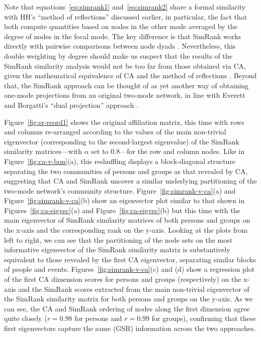 \documentclass[a4paper,fleqn]{cas-sc}
\begin{document}
Note that equations~\ref{eq:simrank1} and~\ref{eq:simrank2} share a formal similarity with HH's ``method of reflections'' discussed earlier, in particular, the fact that both compute quantities based on nodes in the other mode averaged by the degree of nodes in the focal mode. The key difference is that SimRank works directly with pairwise comparisons between node dyads \citep{jeh2002simrank}. Nevertheless, this double weighting by degree should make us suspect that the results of the SimRank similarity analysis would not be too far from those obtained via CA, given the mathematical equivalence of CA and the method of reflections \citep{mealy2019interpreting, van2021correspondence}. Beyond that, the SimRank approach can be thought of as yet another way of obtaining one-mode projections from an original two-mode network, in line with Everett and Borgatti's ``dual projection'' approach \citep{everett2013dual}.

Figure~\ref{fig:sr-reord1} shows the original affiliation matrix, this time with rows and columns re-arranged according to the values of the main non-trivial eigenvector (corresponding to the second-largest eigenvalue) of the SimRank similarity matrices---with $\alpha$ set to $0.8$---for the row and column nodes. Like in Figure~\ref{fig:ca-v-bon}(a), this reshuffling displays a block-diagonal structure separating the two communities of persons and groups as that revealed by CA, suggesting that CA and SimRank uncover a similar underlying partitioning of the two-mode network's community structure. Figure~\ref{fig:simrank-v-ca}(a) and Figure~\ref{fig:simrank-v-ca}(b) show an eigenvector plot similar to that shown in Figures~\ref{fig:ca-eigvec}(a) and Figure~\ref{fig:ca-eigvec}(b) but this time with the main eigenvector of SimRank similarity matrices of both persons and groups on the x-axis and the corresponding rank on the y-axis. Looking at the plots from left to right, we can see that the partitioning of the node sets on the most informative eigenvector of the SimRank similarity matrix is substantively equivalent to those revealed by the first CA eigenvector, separating similar blocks of people and events. Figures~\ref{fig:simrank-v-ca}(c) and (d) show a regression plot of the first CA dimension scores for persons and groups (respectively) on the x-axis and the SimRank scores extracted from the main non-trivial eigenvector of the SimRank similarity matrix for both persons and groups on the y-axis. As we can see, the CA and SimRank ordering of nodes along the first dimension agree quite closely ($r = 0.98$ for persons and $r = 0.99$ for groups), confirming that these first eigenvectors capture the same (GSR) information across the two approaches. 
\end{document}
